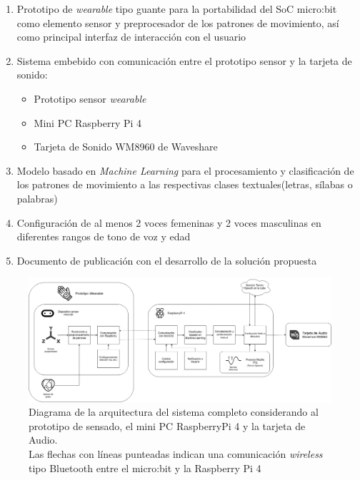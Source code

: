 \begin{enumerate}
	\item Prototipo de \textit{wearable} tipo guante para la portabilidad del SoC micro:bit como elemento sensor y preprocesador de los patrones de movimiento, así como principal interfaz de interacción con el usuario
	
	\item Sistema embebido con comunicación entre el prototipo sensor y la tarjeta de sonido:
	\begin{itemize}
		\item Prototipo sensor \textit{wearable}
		\item Mini PC Raspberry Pi 4
		\item Tarjeta de Sonido WM8960 de Waveshare
	\end{itemize}
	
	\item Modelo basado en \textit{Machine Learning} para el procesamiento y clasificación de los patrones de movimiento a las respectivas clases textuales(letras, sílabas o palabras)
	
	\item Configuración de al menos 2 voces femeninas y 2 voces masculinas en diferentes rangos de tono de voz y edad
	
	\item Documento de publicación con el desarrollo de la solución propuesta
\end{enumerate}

\begin{figure}[!h]
	\centering
	\includegraphics[width=15.8cm]{Imagenes/Diagrama_Arquitectura.png}
	\caption{Diagrama de la arquitectura del sistema completo considerando al prototipo de sensado, el mini PC RaspberryPi 4 y la tarjeta de Audio.\\ Las flechas con líneas punteadas indican una comunicación \textit{wireless} tipo Bluetooth entre el micro:bit y la Raspberry Pi 4}
	\label{Arquitectura}
\end{figure}